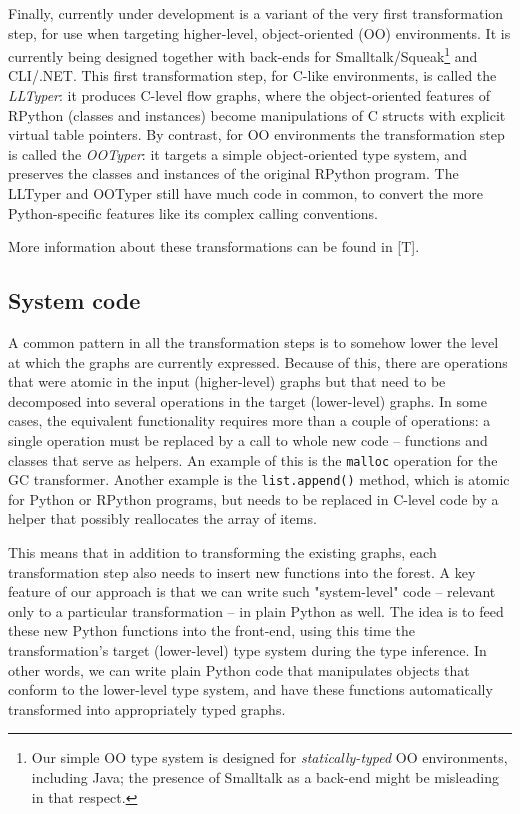 \documentclass{acm_proc_article-sp}
\begin{document}
Finally, currently under development is a variant of the very first
transformation step, for use when targeting higher-level,
object-oriented (OO) environments.  It is currently being designed
together with back-ends for Smalltalk/Squeak\footnote{Our simple OO
type system is designed for \textit{statically-typed} OO environments,
including Java; the presence of Smalltalk as a back-end might be
misleading in that respect.} and CLI/.NET.  This first transformation
step, for C-like environments, is called the \textit{LLTyper}: it produces
C-level flow graphs, where the object-oriented features of RPython
(classes and instances) become manipulations of C structs with
explicit virtual table pointers.  By contrast, for OO environments the
transformation step is called the \textit{OOTyper}: it targets a simple
object-oriented type system, and preserves the classes and instances
of the original RPython program.  The LLTyper and OOTyper still have
much code in common, to convert the more Python-specific features like
its complex calling conventions.

More information about these transformations can be found in [T].


\subsection{System code}

A common pattern in all the transformation steps is to somehow lower the
level at which the graphs are currently expressed.  Because of this,
there are operations that were atomic in the input (higher-level) graphs
but that need to be decomposed into several operations in the target
(lower-level) graphs.  In some cases, the equivalent functionality
requires more than a couple of operations: a single operation must be
replaced by a call to whole new code -- functions and classes that serve
as helpers.  An example of this is the \texttt{malloc} operation for the GC
transformer.  Another example is the \texttt{list.append()} method, which is
atomic for Python or RPython programs, but needs to be replaced in
C-level code by a helper that possibly reallocates the array of items.

This means that in addition to transforming the existing graphs, each
transformation step also needs to insert new functions into the forest.
A key feature of our approach is that we can write such "system-level"
code -- relevant only to a particular transformation -- in plain Python
as well.  The idea is to feed these new Python functions into the
front-end, using this time the transformation's target (lower-level)
type system during the type inference.  In other words, we can write
plain Python code that manipulates objects that conform to the
lower-level type system, and have these functions automatically
transformed into appropriately typed graphs.
\end{document}
